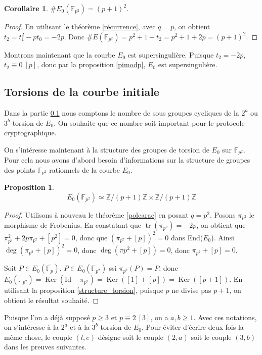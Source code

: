 \documentclass{article}
\theoremstyle{plain}%
\newtheorem{prop}[thm]{Proposition}
\newtheorem{cor}[thm]{Corollaire}
\theoremstyle{definition}%
\newcommand{\F}{\mathbb{F}}
\newcommand{\Z}{\mathbb{Z}}
\DeclareMathOperator{\tr}{tr}
\DeclareMathOperator{\Ker}{Ker}
\begin{document}
\begin{cor}
$\#E_0(\F_{p^2}) = (p+1)^2$.
\end{cor}

\begin{proof}
  En utilisant le théorème \ref{récurrence}, avec $q = p$, on obtient $t_2 = t_1^2 - pt_0 = -2p$. Donc $\#E(\F_{p^2}) = p^2 + 1 - t_2 = p^2 + 1 + 2p = (p+1)^2$.
\end{proof}


Montrons maintenant que la courbe $E_0$ est supersingulière. Puisque $t_2 = -2p$, $t_2 \equiv 0\ [p]$, donc par la proposition \ref{pimodp}, $E_0$ est supersingulière.



\subsection{Torsions de la courbe initiale}
\label{torsion_init}
Dans la partie \ref{torsion_init} nous comptons le nombre de sous groupes cycliques de la $2^a$ ou $3^b$-torsion de $E_0$. On souhaite que ce nombre soit important pour le protocole cryptographique.

On s'intéresse maintenant à la structure des groupes de torsion de $E_0$ sur $\F_{p^2}$. Pour cela nous avons d'abord besoin d'informations sur la structure de groupes des points $\F_{p^2}$ rationnels de la courbe $E_0$. 

\begin{prop}
  $$E_0(\F_{p^2}) \simeq \Z/(p+1)\Z \times \Z/(p+1)\Z$$
\end{prop}

\begin{proof}
  Utilisons à nouveau le théorème \ref{polcarac} en posant $q = p^2$. 
  Posons $\pi_{p^2}$ le morphisme de Frobenius.
  En constatant que $\tr(\pi_{p^2}) = -2p$, on obtient que $\pi_{p^2}^2 + 2p\pi_{p^2} + [p^2] = 0$, donc que $\left( \pi_{p^2} + [p] \right) ^2 = 0$ dans End($E_0$). 
  Ainsi $\deg(\pi_{p^2} + [p])^2 = 0$, donc $\deg(\pi{p^2} + [p]) = 0$, donc $\pi_{p^2} + [p] = 0$.

  Soit $P\in E_0(\overline{\F_{p}})$. $P \in E_0(\F_{p^2})$ ssi $\pi_{p^2}(P) = P$, donc $E_0(\F_{p^2}) = \Ker(\text{Id} - \pi_{p^2}) = \Ker([1] + [p]) = \Ker([p+1])$.
  En utilisant la proposition \ref{structure_torsion}, puisque $p$ ne divise pas $p+1$, on obtient le résultat souhaité.
\end{proof}

 Puisque l'on a déjà supposé $p\ge 3$ et $p \equiv 2\ [3]$, on a $a, b\ge 1$. Avec ces notations, on s'intéresse à la $2^a$ et à la $3^b$-torsion de $E_0$. Pour éviter d'écrire deux fois la même chose, le couple $\left( l, e \right)$ désigne soit le couple $(2, a)$ soit le couple $(3, b)$ dans les preuves suivantes. 
\end{document}

